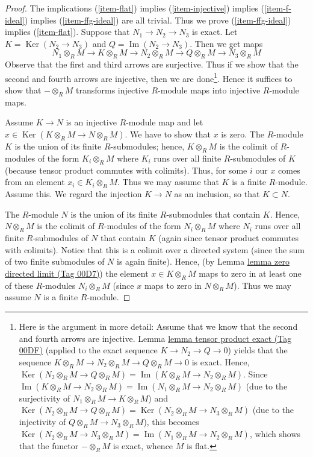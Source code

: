 \documentclass{amsart}
\theoremstyle{plain}
\theoremstyle{definition}
\theoremstyle{remark}
\numberwithin{equation}{subsection}
\def\Ker{\mathop{\mathrm{Ker}}}
\def\Im{\mathop{\mathrm{Im}}}
\begin{document}
\begin{proof}
The implications (\ref{item-flat}) implies (\ref{item-injective})
implies (\ref{item-f-ideal}) implies (\ref{item-ffg-ideal}) are all
trivial. Thus we prove (\ref{item-ffg-ideal}) implies (\ref{item-flat}).
Suppose that $N_1 \to N_2 \to N_3$ is exact.
Let $K = \Ker(N_2 \to N_3)$ and $Q = \Im(N_2 \to N_3)$.
Then we get maps
$$
N_1 \otimes_R M \to
K \otimes_R M \to
N_2 \otimes_R M \to
Q \otimes_R M \to
N_3 \otimes_R M
$$
Observe that the first and third arrows are surjective. Thus if we show
that the second and fourth arrows are injective, then we are
done\footnote{Here is the argument in more detail:
Assume that we know that the second and fourth arrows are
injective. Lemma \href{https://stacks.math.columbia.edu/tag/00DF}{lemma tensor product exact (Tag 00DF)} (applied
to the exact sequence $K \to N_2 \to Q \to 0$) yields that
the sequence $K \otimes_R M \to N_2 \otimes_R M \to
Q \otimes_R M \to 0$ is exact. Hence,
$\Ker \left(N_2 \otimes_R M \to Q \otimes_R M\right)
= \Im \left(K \otimes_R M \to N_2 \otimes_R M\right)$.
Since
$\Im \left(K \otimes_R M \to N_2 \otimes_R M\right)
= \Im \left(N_1 \otimes_R M \to N_2 \otimes_R M\right)$
(due to the surjectivity of $N_1 \otimes_R M \to
K \otimes_R M$) and
$\Ker \left(N_2 \otimes_R M \to Q \otimes_R M\right)
= \Ker \left(N_2 \otimes_R M \to N_3 \otimes_R M\right)$
(due to the injectivity of $Q \otimes_R M \to
N_3 \otimes_R M$), this becomes
$\Ker \left(N_2 \otimes_R M \to N_3 \otimes_R M\right)
= \Im \left(N_1 \otimes_R M \to N_2 \otimes_R M\right)$,
which shows that the functor $- \otimes_R M$ is exact,
whence $M$ is flat.}.
Hence it suffices to show that $- \otimes_R M$ transforms
injective $R$-module maps into injective $R$-module maps.

\medskip\noindent
Assume $K \to N$ is an injective $R$-module map and
let $x \in \Ker(K \otimes_R M \to N \otimes_R M)$.
We have to show that $x$ is zero.
The $R$-module $K$ is the union of its finite
$R$-submodules; hence, $K \otimes_R M$ is
the colimit of $R$-modules of the form
$K_i \otimes_R M$ where $K_i$ runs over all finite
$R$-submodules of $K$
(because tensor product commutes with colimits).
Thus, for some $i$ our $x$ comes from an element
$x_i \in K_i \otimes_R M$. Thus we may assume that $K$
is a finite $R$-module. Assume this. We regard the
injection $K \to N$ as an inclusion, so that
$K \subset N$.

\medskip\noindent
The $R$-module $N$ is the union of its finite
$R$-submodules that contain $K$. Hence, $N \otimes_R M$
is the colimit of $R$-modules of the form
$N_i \otimes_R M$ where $N_i$ runs over all finite
$R$-submodules of $N$ that contain $K$
(again since tensor product commutes with colimits).
Notice that this is a colimit over a directed system
(since the sum of two finite submodules of $N$ is
again finite).
Hence, (by Lemma \href{https://stacks.math.columbia.edu/tag/00D7}{lemma zero directed limit (Tag 00D7)})
the element $x \in K \otimes_R M$ maps to
zero in at least one of these $R$-modules
$N_i \otimes_R M$ (since $x$ maps to zero
in $N \otimes_R M$).
Thus we may assume $N$ is a finite $R$-module.


\end{proof}
\end{document}
